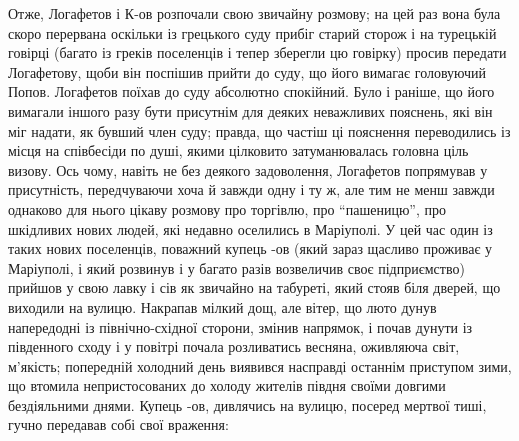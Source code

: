 \documentclass[a4paper,20pt]{report}
\begin{document}
Отже, Логафетов і К-ов розпочали свою звичайну розмову; на цей раз вона була скоро
перервана оскільки із грецького суду прибіг старий сторож і на турецькій говірці 
(багато із греків поселенців і тепер зберегли цю говірку) просив передати Логафетову, щоби він поспішив
прийти до суду, що його вимагає головуючий Попов.
Логафетов поїхав до суду абсолютно спокійний. Було і раніше, що його вимагали іншого разу
бути присутнім для деяких неважливих пояснень, які він міг надати, як бувший член суду; правда, що частіш
ці пояснення переводились із місця на співбесіди по душі, якими цілковито затуманювалась головна ціль визову. Ось чому,
навіть не без деякого задоволення, Логафетов попрямував у присутність, передчуваючи хоча й завжди одну і ту ж, але тим не менш
завжди однаково для нього цікаву розмову про торгівлю, про ``пашеницю'', про шкідливих нових людей, які недавно
оселились в Маріуполі.
У цей час один із таких нових поселенців, поважний купець -ов (який зараз щасливо проживає у Маріуполі,
і який розвинув і у багато разів возвеличив своє підприємство) прийшов у свою
лавку і сів як звичайно на табуреті, який стояв біля дверей, що виходили на
вулицю.
Накрапав мілкий дощ, але вітер, що люто дунув напередодні із північно-східної сторони, змінив напрямок, і почав
дунути із південного сходу і у повітрі почала розливатись весняна, оживляюча світ, м'якість; попередній холодний день
виявився насправді останнім приступом зими, що втомила непристосованих до холоду жителів півдня своїми довгими
бездіяльними днями.
Купець -ов, дивлячись на вулицю, посеред мертвої тиші, гучно передавав собі свої
враження:
\end{document}
